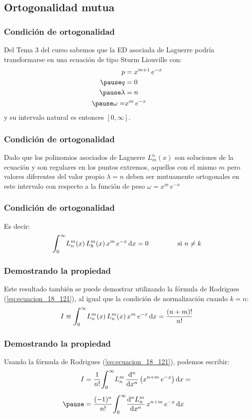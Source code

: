 \documentclass[12pt]{beamer}
\begin{document}
\subsection{Ortogonalidad mutua}

\begin{frame}
\frametitle{Condición de ortogonalidad}
Del Tema 3 del curso sabemos que la ED asociada de Laguerre podría transformarse en una ecuación de tipo Sturm Liouville con:
\pause
\begin{eqnarray*}
\begin{aligned}
p &= x^{m+1} \, e^{-x} \\ \pause
q &= 0 \\ \pause
\lambda &= n \\ \pause
\omega =& x^{m} \, e^{-x}
\end{aligned}
\end{eqnarray*}
y su intervalo natural es entonces $[0, \infty]$.
\end{frame}
\begin{frame}
\frametitle{Condición de ortogonalidad}
Dado que los polinomios asociados de Laguerre $L_{m}^{n} (x)$ son soluciones de la ecuación y son regulares en los puntos extremos, \pause aquellos con el mismo $m$ pero valores diferentes del valor propio $\lambda = n$ deben ser mutuamente ortogonales en este intervalo con respecto a la función de peso $\omega = x^{m} \, e^{-x}$
\end{frame}
\begin{frame}
\frametitle{Condición de ortogonalidad}
Es decir:
\pause
\begin{align*}
\scaleint{6ex}_{\bs 0}^{\infty} L_{n}^{m} (x) \, L_{k}^{m} (x) \, x^{m} \, e^{-x} \dd{x} = 0 \hspace{1.5cm} \mbox{si } n \neq k
\end{align*}
\end{frame}
\begin{frame}
\frametitle{Demostrando la propiedad}
Este resultado también se puede demostrar utilizando la fórmula de Rodrigues (\ref{eq:ecuacion_18_121}), al igual que la condición de normalización cuando $k = n$:
\pause
\begin{align}
I \equiv \scaleint{6ex}_{\bs 0}^{\infty} L_{n}^{m} (x) \, L_{n}^{m} (x) \, x^{m} \, e^{-x} \dd{x} =\dfrac{(n + m)!}{n!}
\label{eq:ecuacion_18_122}
\end{align}
\end{frame}
\begin{frame}
\frametitle{Demostrando la propiedad}
Usando la fórmula de Rodrigues (\ref{eq:ecuacion_18_121}), podemos escribir:
\pause
\begin{eqnarray*}
\begin{aligned}
I &= \dfrac{1}{n!} \scaleint{6ex}_{\bs 0}^{\infty} L_{n}^{m} \, \dv[n]{x} \left( x^{n+m} \, e^{-x} \right) \dd{x} = \\[0.5em] \pause 
&= \dfrac{(-1)^{n}}{n!} \scaleint{6ex}_{\bs 0}^{\infty} \dv[n]{L_{n}^{m}}{x} \, x^{n+m} \, e^{-x} \dd{x}
\end{aligned}
\end{eqnarray*}
\end{frame}
\end{document}
